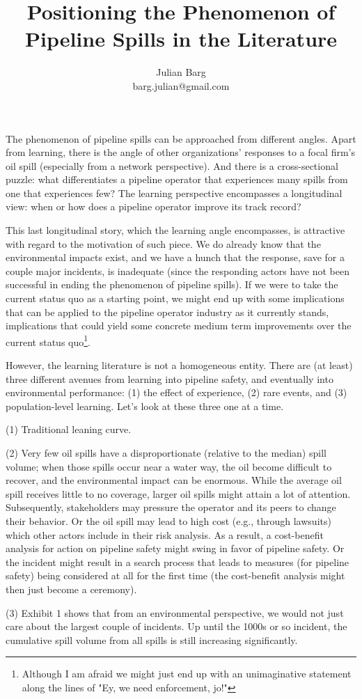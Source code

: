 \documentclass[12pt, man, natbib]{apa6}
\title{Positioning the Phenomenon of Pipeline Spills in the Literature}
\author{Julian Barg\\barg.julian@gmail.com}
\affiliation{Ivey Business School}
\begin{document}
	
	\maketitle
	
	\singlespacing
	
	\section{}	
	
	The phenomenon of pipeline spills can be approached from different angles. Apart from learning, there is the angle of other organizations' responses to a focal firm's oil spill (especially from a network perspective). And there is a cross-sectional puzzle: what differentiates a pipeline operator that experiences many spills from one that experiences few? The learning perspective encompasses a longitudinal view: when or how does a pipeline operator improve its track record? 
	
	This last longitudinal story, which the learning angle encompasses, is attractive with regard to the motivation of such piece. We do already know that the environmental impacts exist, and we have a hunch that the response, save for a couple major incidents, is inadequate (since the responding actors have not been successful in ending the phenomenon of pipeline spills). If we were to take the current status quo as a starting point, we might end up with some implications that can be applied to the pipeline operator industry as it currently stands, implications that could yield some concrete medium term improvements over the current status quo\footnote{Although I am afraid we might just end up with an unimaginative statement along the lines of "Ey, we need enforcement, jo!"}.
	
	However, the learning literature is not a homogeneous entity. There are (at least) three different avenues from learning into pipeline safety, and eventually into environmental performance: (1) the effect of experience, (2) rare events, and (3) population-level learning. Let's look at these three one at a time.
	
	(1) Traditional leaning curve.
	
	(2) Very few oil spills have a disproportionate (relative to the median) spill volume; when those spills occur near a water way, the oil become difficult to recover, and the environmental impact can be enormous. While the average oil spill receives little to no coverage, larger oil spills might attain a lot of attention. Subsequently, stakeholders may pressure the operator and its peers to change their behavior. Or the oil spill may lead to high cost (e.g., through lawsuits) which other actors include in their risk analysis. As a result, a cost-benefit analysis for action on pipeline safety might swing in favor of pipeline safety. Or the incident might result in a search process that leads to measures (for pipeline safety) being considered at all for the first time (the cost-benefit analysis might then just become a ceremony).
	
	(3) Exhibit 1 shows that from an environmental perspective, we would not just care about the largest couple of incidents. Up until the 1000s or so incident, the cumulative spill volume from all spills is still increasing significantly.
	

\end{document}
